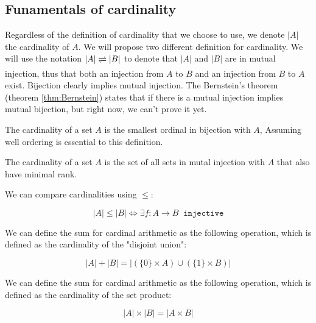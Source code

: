 
\subsection{Funamentals of cardinality}
Regardless of the definition of cardinality that we choose to use, we denote $|A|$ the 
cardinality of $A$. We will propose two different definition for cardinality. We will use the 
notation $|A| \darr |B|$ to denote that $|A|$ and $|B|$ are in mutual injection, 
thus that both an injection from $A$ to $B$ and an injection from $B$ to $A$ exist. Bijection 
clearly implies mutual injection. The Bernstein's theorem (theorem \ref{thm:Bernstein}) states that 
if there is a mutual injection implies mutual bijection, but right 
now, we can't prove it yet. \\

\begin{definition}
\label{def:cardinalityAC}
The cardinality of a set $A$ is the smallest ordinal in bijection with $A$, 
Assuming well ordering is essential to this definition.
\end{definition}

\begin{definition}
\label{def:cardinalityAC}
The cardinality of a set $A$ is the set of all sets in mutal injection with $A$ that also have 
minimal rank. \\
\end{definition}

\begin{definition}
We can compare cardinalities using $\leq$:

$$ |A| \leq |B| \iff \exists f : A \rightarrow B \;\;\texttt{injective} $$
\end{definition}

\begin{definition}
We can define the sum for cardinal arithmetic as the following operation, which 
is defined as the cardinality of the "disjoint union":

$$ |A| + |B| = | (\{0\} \times A) \cup (\{1\} \times B) | $$
\end{definition}

\begin{definition}
We can define the sum for cardinal arithmetic as the following operation, which 
is defined as the cardinality of the set product:

$$ |A| \times |B| = | A \times B | $$
\end{definition}



